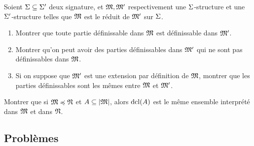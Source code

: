 \begin{exercise}
  Soient $\Sigma\subseteq\Sigma'$ deux signature, et $\mathfrak{M},\mathfrak{M}'$
  respectivement une $\Sigma$-structure et une $\Sigma'$-structure telles que
  $\mathfrak{M}$ est le réduit de $\mathfrak{M}'$ sur $\Sigma$.
  \begin{enumerate}[label=(\roman*)]
  \item Montrer que toute partie définissable dans $\mathfrak{M}$ est définissable
    dans $\mathfrak{M}'$.
  \item Montrer qu'on peut avoir des parties définissables dans $\mathfrak{M}'$ qui
    ne sont pas définissables dans $\mathfrak{M}$.
  \item Si on suppose que $\mathfrak{M}'$ est une extension par définition de
    $\mathfrak{M}$, montrer que les parties définissables sont les mêmes entre
    $\mathfrak{M}$ et $\mathfrak{M}'$.
  \end{enumerate}
\end{exercise}

\begin{exercise}
  Montrer que si $\mathfrak{M}\preccurlyeq \mathfrak{N}$ et $A\subseteq\left\vert \mathfrak{M}\right\vert$, alors
  $\operatorname{dcl}(A)$ est le même ensemble interprété dans $\mathfrak{M}$ et dans $\mathfrak{N}$.
\end{exercise}

\clearpage

\subsection{Problèmes}
